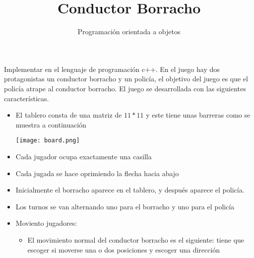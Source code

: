 \documentclass[10pt,a4paper]{article}
\title{Conductor Borracho}
\date{Programación orientada a objetos }
\begin{document}
\maketitle

Implementar en el lenguaje de programación c++. En el juego hay dos protagonistas un conductor borracho y un policía, el objetivo del juego es que el policía atrape al conductor borracho. El juego se desarrollada con las siguientes características.

\begin{itemize}
	\item El tablero consta de una matriz de $11*11$ y este tiene unas barreras como se muestra a continuación
	\begin{center}
		\texttt{[image: board.png]}
	\end{center}
	
	\item Cada jugador ocupa exactamente una casilla
	
	\item Cada jugada se hace oprimiendo la flecha hacia abajo
	\item Inicialmente el borracho aparece en el tablero, y después aparece el policía.
	
	\item Los turnos se van alternando uno para el borracho y uno para el policía
	
	\item Moviento jugadores:
	\begin{itemize}
		\item El movimiento normal del conductor borracho es el siguiente: tiene que escoger si moverse una o dos posiciones y escoger una dirección
		

\end{itemize}
\end{itemize}
\end{document}
